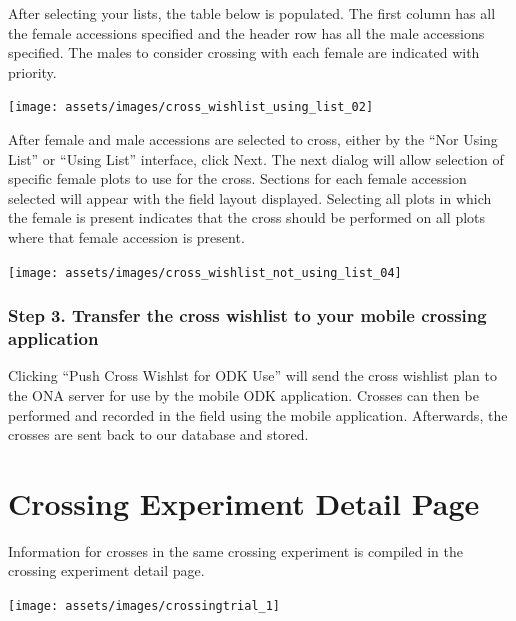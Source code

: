 \documentclass[
  12pt,
]{book}
\begin{document}
After selecting your lists, the table below is populated. The first column has all the female accessions specified and the header row has all the male accessions specified. The males to consider crossing with each female are indicated with priority.

\begin{center}\texttt{[image: assets/images/cross\_wishlist\_using\_list\_02]} \end{center}

After female and male accessions are selected to cross, either by the ``Nor Using List'' or ``Using List'' interface, click Next. The next dialog will allow selection of specific female plots to use for the cross. Sections for each female accession selected will appear with the field layout displayed. Selecting all plots in which the female is present indicates that the cross should be performed on all plots where that female accession is present.

\begin{center}\texttt{[image: assets/images/cross\_wishlist\_not\_using\_list\_04]} \end{center}

\hypertarget{step-3.-transfer-the-cross-wishlist-to-your-mobile-crossing-application}{%
\subsubsection*{Step 3. Transfer the cross wishlist to your mobile crossing application}\label{step-3.-transfer-the-cross-wishlist-to-your-mobile-crossing-application}}


Clicking ``Push Cross Wishlst for ODK Use'' will send the cross wishlist plan to the ONA server for use by the mobile ODK application. Crosses can then be performed and recorded in the field using the mobile application. Afterwards, the crosses are sent back to our database and stored.

\hypertarget{crossing-experiment-detail-page}{%
\section{Crossing Experiment Detail Page}\label{crossing-experiment-detail-page}}

Information for crosses in the same crossing experiment is compiled in the crossing experiment detail page.

\begin{center}\texttt{[image: assets/images/crossingtrial\_1]} \end{center}
\end{document}
